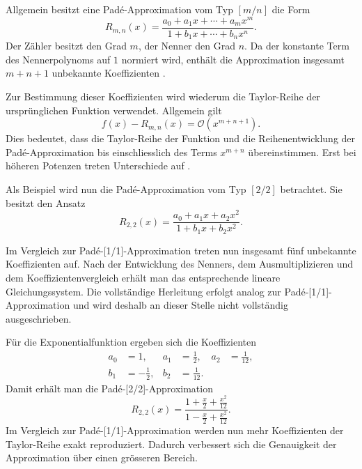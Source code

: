 Allgemein besitzt eine Padé-Approximation vom Typ \([m/n]\) die Form
\begin{equation*}
	R_{m,n}(x)
	=
	\frac
	{a_0+a_1x+\cdots+a_mx^m}
	{1+b_1x+\cdots+b_nx^n}.
\end{equation*}
Der Zähler besitzt den Grad \(m\), der Nenner den Grad \(n\). Da der konstante Term des Nennerpolynoms auf \(1\) normiert wird, enthält die Approximation insgesamt \(m+n+1\) unbekannte Koeffizienten \cite{baker_graves_morris_1996}.

Zur Bestimmung dieser Koeffizienten wird wiederum die Taylor-Reihe der ursprünglichen Funktion verwendet. Allgemein gilt
\begin{equation*}
	f(x)-R_{m,n}(x)
	=
	\mathcal{O}(x^{m+n+1}).
\end{equation*}
Dies bedeutet, dass die Taylor-Reihe der Funktion und die Reihenentwicklung der Padé-Approximation bis einschliesslich des Terms \(x^{m+n}\) übereinstimmen. Erst bei höheren Potenzen treten Unterschiede auf \cite{baker_graves_morris_1996}.

Als Beispiel wird nun die Padé-Approximation vom Typ \([2/2]\) betrachtet. Sie besitzt den Ansatz
%
\[
R_{2,2}(x)
=
\frac{a_0+a_1x+a_2x^2}
{1+b_1x+b_2x^2}.
\]

Im Vergleich zur Padé-[1/1]-Approximation treten nun insgesamt fünf unbekannte Koeffizienten auf. Nach der Entwicklung des Nenners, dem Ausmultiplizieren und dem Koeffizientenvergleich erhält man das entsprechende lineare Gleichungssystem. Die vollständige Herleitung erfolgt analog zur Padé-[1/1]-Approximation und wird deshalb an dieser Stelle nicht vollständig ausgeschrieben.

Für die Exponentialfunktion ergeben sich die Koeffizienten
\begin{align*}
	a_0 &= 1, &
	a_1 &= \frac12, &
	a_2 &= \frac1{12},\\
	b_1 &= -\frac12, &
	b_2 &= \frac1{12}.
\end{align*}
Damit erhält man die Padé-[2/2]-Approximation
\begin{equation*}
	R_{2,2}(x)
	=
	\frac
	{1+\frac{x}{2}+\frac{x^2}{12}}
	{1-\frac{x}{2}+\frac{x^2}{12}}.
\end{equation*}
Im Vergleich zur Padé-[1/1]-Approximation werden nun mehr Koeffizienten der Taylor-Reihe exakt reproduziert. Dadurch verbessert sich die Genauigkeit der Approximation über einen grösseren Bereich.

